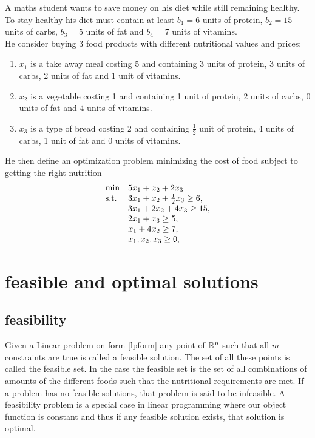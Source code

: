 \begin{example}\label{lpex}
A maths student wants to save money on his diet while still remaining healthy. To stay healthy his diet must contain at least $b_1=6$ units of protein, $b_2=15$ units of carbs, $b_3=5$ units of fat and $b_4=7$ units of vitamins.\\
He consider buying 3 food products with different nutritional values and prices: 
\begin{enumerate}
\item $x_1$ is a take away meal costing 5 and containing 3 units of protein, 3 units of carbs, 2 units of fat and 1 unit of vitamins.
\item $x_2$ is a vegetable costing 1 and containing 1 unit of protein, 2 units of carbs, 0 units of fat and 4 units of vitamins.
\item $x_3$ is a type of bread costing 2 and containing $\frac{1}{2}$ unit of protein, 4 units of carbs, 1 unit of fat and 0 units of vitamins.
\end{enumerate}
He then define an optimization problem minimizing the cost of food subject to getting the right nutrition
\begin{align}
\begin{array}{ll@{}ll}
\text{min} &5x_1+x_2+2x_3&\\
\text{s.t.} &3x_1+x_2+\frac{1}{2}x_3 \geq 6,&\\
&3x_1+2x_2+4x_3 \geq 15,&\\
&2x_1+x_3 \geq 5,&\\
&x_1+4x_2 \geq 7,&\\
&x_1,x_2,x_3 \geq 0,&\\
\end{array}
\end{align}
\end{example}
\section{feasible and optimal solutions}
\subsection{feasibility}
Given a Linear problem on form \ref{lpform} any point of $\mathbb{R}^n$ such that all $m$ constraints are true is called a feasible solution. The set of all these points is called the feasible set. In the case  the feasible set is the set of all combinations of amounts of the different foods such that the nutritional requirements are met. If a problem has no feasible solutions, that problem is said to be infeasible. A feasibility problem is a special case in linear programming where our object function is constant and thus if any feasible solution exists, that solution is optimal.
